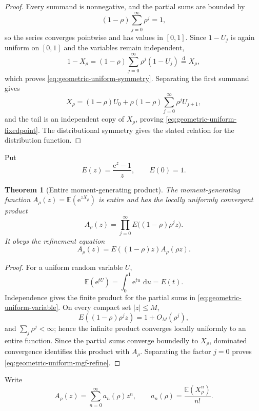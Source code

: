 \documentclass[11pt,oneside,openany]{book}
\newtheorem{theorem}{Theorem}[chapter]
\theoremstyle{definition}
\theoremstyle{remark}
\newcommand{\e}{\mathrm e}
\newcommand{\dd}{\,\mathrm d}
\newcommand{\E}{\mathbb E}
\begin{document}
\begin{proof}
Every summand is nonnegative, and the partial sums are bounded by
\[
 (1-\rho)\sum_{j=0}^{\infty}\rho^j=1,
\]
so the series converges pointwise and has values in $[0,1]$.  Since $1-U_j$ is again uniform on $[0,1]$ and the variables remain independent,
\[
 1-X_\rho=(1-\rho)\sum_{j=0}^{\infty}\rho^j(1-U_j)
 \mathrel{\overset{\mathrm d}{=}}X_\rho,
\]
which proves \eqref{eq:geometric-uniform-symmetry}.  Separating the first summand gives
\[
 X_\rho=(1-\rho)U_0+\rho(1-\rho)\sum_{j=0}^{\infty}\rho^jU_{j+1},
\]
and the tail is an independent copy of $X_\rho$, proving \eqref{eq:geometric-uniform-fixedpoint}.  The distributional symmetry gives the stated relation for the distribution function.
\end{proof}

Put
\[
 E(z)=\frac{\e^z-1}{z},\qquad E(0)=1.
\]

\begin{theorem}[Entire moment-generating product]\label{thm:geometric-uniform-mgf}
The moment-generating function $A_\rho(z)=\E(\e^{zX_\rho})$ is entire and has the locally uniformly convergent product
\begin{equation}
 A_\rho(z)=\prod_{j=0}^{\infty}
 E\bigl((1-\rho)\rho^jz\bigr).\label{eq:geometric-uniform-mgf}
\end{equation}
It obeys the refinement equation
\begin{equation}
 A_\rho(z)=E((1-\rho)z)A_\rho(\rho z).\label{eq:geometric-uniform-mgf-refine}
\end{equation}
\end{theorem}

\begin{proof}
For a uniform random variable $U$,
\[
 \E(\e^{tU})=\int_0^1\e^{tu}\,\dd u=E(t).
\]
Independence gives the finite product for the partial sums in \eqref{eq:geometric-uniform-variable}.  On every compact set $|z|\le M$,
\[
 E((1-\rho)\rho^jz)=1+O_M(\rho^j),
\]
and $\sum_j\rho^j<\infty$; hence the infinite product converges locally uniformly to an entire function.  Since the partial sums converge boundedly to $X_\rho$, dominated convergence identifies this product with $A_\rho$.  Separating the factor $j=0$ proves \eqref{eq:geometric-uniform-mgf-refine}.
\end{proof}

Write
\begin{equation}
 A_\rho(z)=\sum_{n=0}^{\infty}a_n(\rho)z^n,
 \qquad
 a_n(\rho)=\frac{\E(X_\rho^n)}{n!}.\label{eq:geometric-uniform-moments}
\end{equation}
\end{document}
